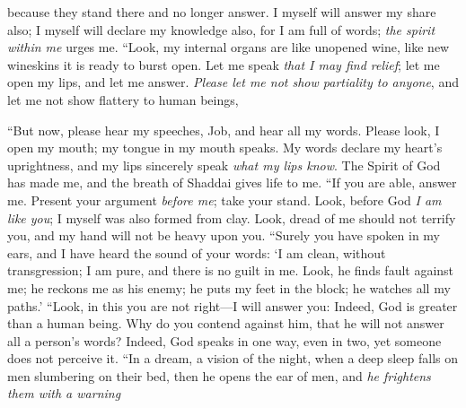 \begin{biblechapter}
because they stand there and no longer answer.
\verse I myself will answer my share also; 
I myself will declare my knowledge also,
\verse for I am full of words; 
\textit{the spirit within me} urges me.
\verse “Look, my internal organs are like unopened wine, 
like new wineskins it is ready to burst open.
\verse Let me speak \textit{that I may find relief}; 
let me open my lips, and let me answer.
\verse \textit{Please let me not show partiality to anyone}, 
and let me not show flattery to human beings,
\end{biblechapter}

\begin{biblechapter} %
 “But now, please hear my speeches, Job, 
and hear all my words.
\verse Please look, I open my mouth; 
my tongue in my mouth speaks.
\verse My words declare my heart’s uprightness, 
and my lips sincerely speak \textit{what my lips know}.
\verse The Spirit of God has made me, 
and the breath of Shaddai gives life to me.
\verse “If you are able, answer me. 
Present your argument \textit{before me}; take your stand.
\verse Look, before God \textit{I am like you}; 
I myself was also formed from clay.
\verse Look, dread of me should not terrify you, 
and my hand will not be heavy upon you.
\verse “Surely you have spoken in my ears, 
and I have heard the sound of your words:
\verse ‘I am clean, without transgression; 
I am pure, and there is no guilt in me.
\verse Look, he finds fault against me; 
he reckons me as his enemy;
\verse he puts my feet in the block; 
he watches all my paths.’
\verse “Look, in this you are not right—I will answer you: 
Indeed, God is greater than a human being.
\verse Why do you contend against him, 
that he will not answer all a person’s words?
\verse Indeed, God speaks in one way, 
even in two, yet someone does not perceive it.
\verse “In a dream, a vision of the night, 
when a deep sleep falls on men slumbering on their bed,
\verse then he opens the ear of men, 
and \textit{he frightens them with a warning}

\end{biblechapter}
